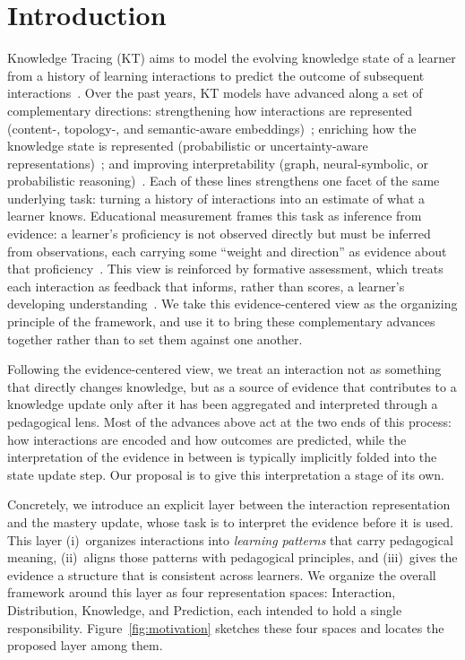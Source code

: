 \documentclass[conference]{IEEEtran}
\begin{document}
\section{Introduction}
\label{sec:intro}

Knowledge Tracing (KT) aims to model the evolving knowledge state of a learner from a history of learning interactions to predict the outcome of subsequent interactions~\cite{corbett1994kt, piech2015dkt}. Over the past years, KT models have advanced along a set of complementary directions: strengthening how interactions are represented (content-, topology-, and semantic-aware embeddings)~\cite{li2025mckt, xia2025cmdkt}; enriching how the knowledge state is represented (probabilistic or uncertainty-aware representations)~\cite{chen2025ukt, li2025keenkt, wu2026sskt}; and improving interpretability (graph, neural-symbolic, or probabilistic reasoning)~\cite{nakagawa2019gkt, zhou2024psikt, hooshyar2026nskt, wu2026plkt}. Each of these lines strengthens one facet of the same underlying task: turning a history of interactions into an estimate of what a learner knows. Educational measurement frames this task as inference from evidence: a learner's proficiency is not observed directly but must be inferred from observations, each carrying some ``weight and direction'' as evidence about that proficiency~\cite{mislevy2005ecd}. This view is reinforced by formative assessment, which treats each interaction as feedback that informs, rather than scores, a learner's developing understanding~\cite{black2009formative}. We take this evidence-centered view as the organizing principle of the framework, and use it to bring these complementary advances together rather than to set them against one another.

Following the evidence-centered view, we treat an interaction not as something that directly changes knowledge, but as a source of evidence that contributes to a knowledge update only after it has been aggregated and interpreted through a pedagogical lens. Most of the advances above act at the two ends of this process: how interactions are encoded and how outcomes are predicted, while the interpretation of the evidence in between is typically implicitly folded into the state update step. Our proposal is to give this interpretation a stage of its own.

Concretely, we introduce an explicit layer between the interaction representation and the mastery update, whose task is to interpret the evidence before it is used. This layer (i)~organizes interactions into \emph{learning patterns} that carry pedagogical meaning, (ii)~aligns those patterns with pedagogical principles, and (iii)~gives the evidence a structure that is consistent across learners. We organize the overall framework around this layer as four representation spaces: Interaction, Distribution, Knowledge, and Prediction, each intended to hold a single responsibility. Figure~\ref{fig:motivation} sketches these four spaces and locates the proposed layer among them.
\end{document}
